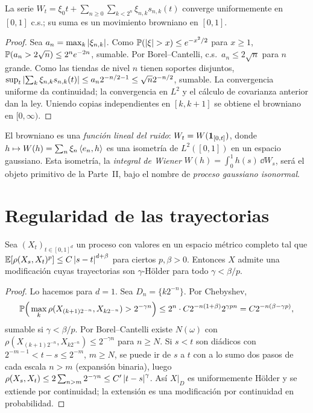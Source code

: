 \begin{teorema}
La serie $W_t=\xi_0t+\sum_{n\ge0}\sum_{k<2^n}\xi_{n,k}s_{n,k}(t)$ converge
uniformemente en $[0,1]$ c.s.; su suma es un movimiento browniano en $[0,1]$.
\end{teorema}

\begin{proof}
Sea $a_n=\max_k\abs{\xi_{n,k}}$. Como $\P(\abs{\xi}>x)\le e^{-x^2/2}$ para $x\ge1$, $\P(a_n>2\sqrt n)\le
2^ne^{-2n}$, sumable. Por Borel--Cantelli, c.s.\ $a_n\le2\sqrt n$ para $n$ grande. Como las tiendas de
nivel $n$ tienen soportes disjuntos, $\sup_t\abs{\sum_k\xi_{n,k}s_{n,k}(t)}\le a_n2^{-n/2-1}\le\sqrt n2^{-n/2}$, sumable. La
convergencia uniforme da continuidad; la convergencia en $L^2$ y el cálculo de covarianza anterior
dan la ley. Uniendo copias independientes en $[k,k+1]$ se obtiene el browniano en $[0,\infty)$.
\end{proof}

\begin{intuicion}
El browniano es una \emph{función lineal del ruido}: $W_t=W(\ind_{[0,t]})$, donde $h\mapsto W(h)=
\sum_n\xi_n\ip{e_n}{h}$ es una isometría de $L^2([0,1])$ en un espacio gaussiano. Esta isometría, la
\emph{integral de Wiener} $W(h)=\int_0^1h(s)\,\dd W_s$, será el objeto primitivo de la Parte~II, bajo el
nombre de \emph{proceso gaussiano isonormal}.
\end{intuicion}

\section{Regularidad de las trayectorias}

\begin{teorema}\label{teo:kolmogorov}
Sea $(X_t)_{t\in[0,1]^d}$ un proceso
con valores en un espacio métrico completo tal que $\E[\rho(X_s,X_t)^p]\le C\abs{s-t}^{d+\beta}$ para ciertos
$p,\beta>0$. Entonces $X$ admite una modificación cuyas trayectorias son $\gamma$-Hölder para todo
$\gamma<\beta/p$.
\end{teorema}

\begin{proof}
Lo hacemos para $d=1$. Sea $D_n=\{k2^{-n}\}$. Por Chebyshev,
\[
  \P\Big(\max_k\rho(X_{(k+1)2^{-n}},X_{k2^{-n}})>2^{-\gamma n}\Big)\le2^n\cdot C2^{-n(1+\beta)}2^{\gamma pn}=C2^{-n(\beta-\gamma p)},
\]
sumable si $\gamma<\beta/p$. Por Borel--Cantelli existe $N(\omega)$ con $\rho(X_{(k+1)2^{-n}},X_{k2^{-n}})\le2^{-\gamma n}$ para
$n\ge N$. Si $s<t$ son diádicos con $2^{-m-1}<t-s\le2^{-m}$, $m\ge N$, se puede ir de $s$ a $t$ con a lo
sumo dos pasos de cada escala $n>m$ (expansión binaria), luego $\rho(X_s,X_t)\le2\sum_{n>m}2^{-\gamma n}\le
C'\abs{t-s}^\gamma$. Así $X|_D$ es uniformemente Hölder y se extiende por continuidad; la extensión es
una modificación por continuidad en probabilidad.
\end{proof}

